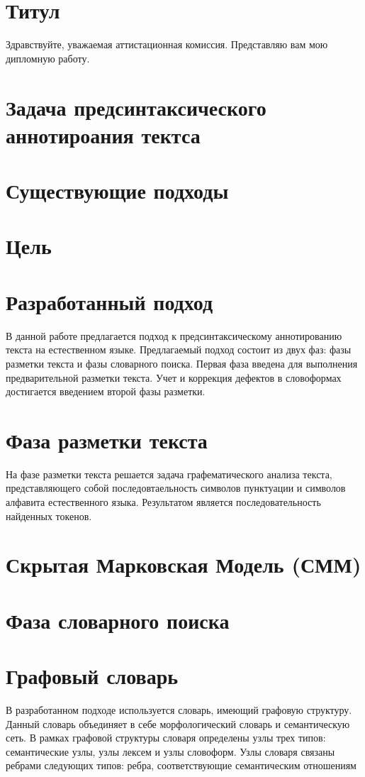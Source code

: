 \documentclass[14pt]{extarticle}
\begin{document}
\section{Титул}
Здравствуйте, уважаемая аттистационная комиссия. 
Представляю вам мою дипломную работу.


\section{Задача предсинтаксического аннотироания тектса}


\section{Существующие подходы}


\section{Цель}


\section{Разработанный подход}
В данной работе предлагается подход к предсинтаксическому аннотированию текста на естественном языке. Предлагаемый подход состоит из двух фаз: фазы разметки текста и фазы словарного поиска. Первая фаза введена для выполнения предварительной разметки текста. Учет и коррекция дефектов в словоформах достигается введением второй фазы разметки.

\section{Фаза разметки текста}
На фазе разметки текста решается задача графематического анализа текста, представляющего собой последовтаельность символов пунктуации и символов алфавита естественного языка. Результатом является последовательность найденных токенов.

\section{Скрытая Марковская Модель (СММ)}


\section{Фаза словарного поиска}


\section{Графовый словарь}
В разработанном подходе используется словарь, имеющий графовую структуру.  Данный словарь объединяет в себе морфологический словарь и семантическую сеть. В рамках графовой структуры словаря определены узлы трех типов: семантические узлы, узлы лексем и узлы словоформ. Узлы словаря связаны ребрами следующих типов: ребра, соответствующие семантическим отношениям
\end{document}
